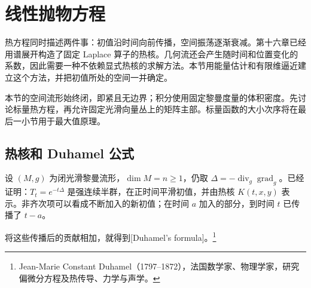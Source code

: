 
% 
% 

\section{线性抛物方程}
\label{g3:sec:2601}

热方程同时描述两件事：初值沿时间向前传播，空间振荡逐渐衰减。第十六章已经用谱展开构造了固定 Laplace 算子的热核。几何流还会产生随时间和位置变化的系数，因此需要一种不依赖显式热核的求解方法。本节用能量估计和有限维逼近建立这个方法，并把初值所处的空间一并确定。

\ProseParagraphBreak
本节的空间流形始终闭，即紧且无边界；积分使用固定黎曼度量的体积密度。先讨论标量热方程，再允许固定光滑向量丛上的矩阵主部。标量函数的大小次序将在最后一小节用于最大值原理。

\subsection{热核和 Duhamel 公式}
\label{g3:subsec:2601:01}
设 \((M,g)\) 为闭光滑黎曼流形，\(\dim M=n\ge1\)，仍取 \(\Delta=-\operatorname{div}_g\operatorname{grad}_g\)。已经证明：\(T_t=e^{-t\Delta}\) 是强连续半群，在正时间平滑初值，并由热核 \(K(t,x,y)\) 表示。非齐次项可以看成不断加入的新初值；在时间 \(a\) 加入的部分，到时间 \(t\) 已传播了 \(t-a\)。

\ProseParagraphBreak
将这些传播后的贡献相加，就得到[Duhamel's formula]。\footnote{Jean-Marie Constant Duhamel（1797--1872），法国数学家、物理学家，研究偏微分方程及热传导、力学与声学。}

